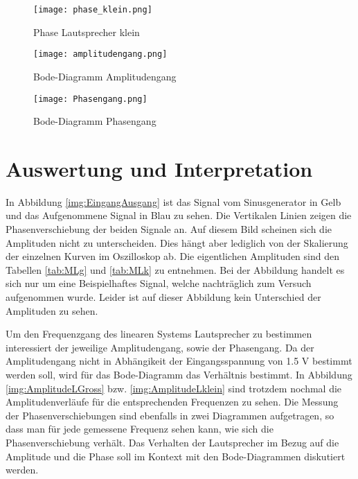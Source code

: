 \begin{figure}[H]
\centering
\texttt{[image: phase\_klein.png]}
\caption{Phase Lautsprecher klein}
\label{img:PhaseKlein}
\end{figure}

\begin{figure}[H]
\centering
\texttt{[image: amplitudengang.png]}
\caption{Bode-Diagramm Amplitudengang}
\label{img:BodeAmplitude}
\end{figure}

\begin{figure}[H]
\centering
\texttt{[image: Phasengang.png]}
\caption{Bode-Diagramm Phasengang}
\label{img:PhasenGang Bode-Diagramm}
\end{figure}


\section{Auswertung und Interpretation}
\label{chap:AUSWERTUNGUNDINTERPRETATION}
In Abbildung \ref{img:EingangAusgang} ist das Signal vom Sinusgenerator in Gelb und das Aufgenommene Signal in Blau zu sehen. Die Vertikalen Linien zeigen die Phasenverschiebung der beiden Signale an. Auf diesem Bild scheinen sich die Amplituden nicht zu unterscheiden. Dies hängt aber lediglich von der Skalierung der einzelnen Kurven im Oszilloskop ab. Die eigentlichen Amplituden sind den Tabellen \ref{tab:MLg} und \ref{tab:MLk} zu entnehmen. Bei der Abbildung handelt es sich nur um eine Beispielhaftes Signal, welche nachträglich zum Versuch aufgenommen wurde. Leider ist auf dieser Abbildung kein Unterschied der Amplituden zu sehen.

Um den Frequenzgang des linearen Systems Lautsprecher zu bestimmen interessiert der jeweilige Amplitudengang, sowie der Phasengang. Da der Amplitudengang nicht in Abhängikeit der Eingangsspannung von 1.5 V bestimmt werden soll, wird für das Bode-Diagramm das Verhältnis bestimmt. In Abbildung \ref{img:AmplitudeLGross} bzw. \ref{img:AmplitudeLklein} sind trotzdem nochmal die Amplitudenverläufe für die entsprechenden Frequenzen zu sehen. Die Messung der Phasenverschiebungen sind ebenfalls in zwei Diagrammen aufgetragen, so dass man für jede gemessene Frequenz sehen kann, wie sich die Phasenverschiebung verhält. Das Verhalten der Lautsprecher im Bezug auf die Amplitude und die Phase soll im Kontext mit den Bode-Diagrammen diskutiert werden.

